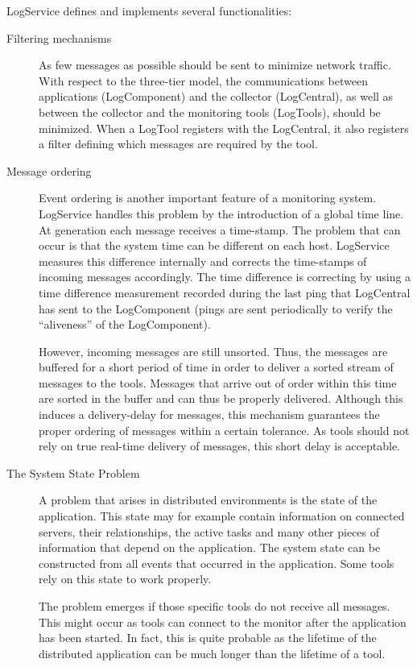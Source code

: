 \noindent
LogService defines and implements several functionalities:
\begin{description}
  \item[Filtering mechanisms] As few messages as possible should be sent to
    minimize network traffic.  With respect to the three-tier model, the
    communications between applications (\eg LogComponent) and the collector
    (\eg LogCentral), as well as between the collector and the monitoring tools
    (\eg LogTools), should be minimized.  When a LogTool registers with the
    LogCentral, it also registers a filter defining which messages are required
    by the tool.

  \item[Message ordering] Event ordering is another important feature of a
    monitoring system. LogService handles this problem by the introduction of a
    global time line. At generation each message receives a time-stamp. The
    problem that can occur is that the system time can be different on each
    host. LogService measures this difference internally and corrects the
    time-stamps of incoming messages accordingly. The time difference is
    correcting by using a time difference measurement recorded during the last
    ping that LogCentral has sent to the LogComponent (pings are sent
    periodically to verify the ``aliveness'' of the LogComponent).

    However, incoming messages are still unsorted. Thus, the messages are
    buffered for a short period of time in order to deliver a sorted stream of
    messages to the tools.  Messages that arrive out of order within this time
    are sorted in the buffer and can thus be properly delivered.  Although this
    induces a delivery-delay for messages, this mechanism guarantees the proper
    ordering of messages within a certain tolerance.  As tools should not rely
    on true real-time delivery of messages, this short delay is acceptable.
    
  \item[The System State Problem] A problem that arises in distributed
    environments is the state of the application. This state may for example
    contain information on connected servers, their relationships, the active
    tasks and many other pieces of information that depend on the application.
    The system state can be constructed from all events that occurred in the
    application. Some tools rely on this state to work properly.

    The problem emerges if those specific tools do not receive all messages.
    This might occur as tools can connect to the monitor after the application
    has been started.  In fact, this is quite probable as the lifetime of the
    distributed application can be much longer than the lifetime of a tool.


\end{description}
